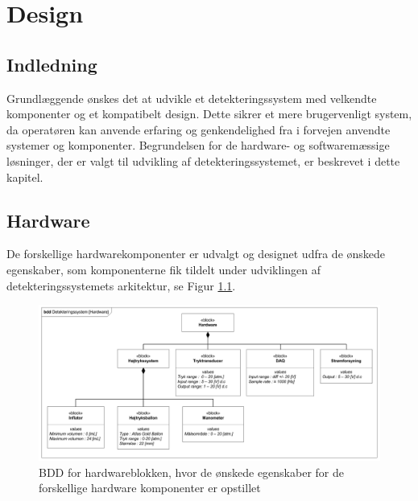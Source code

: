\chapter{Design}


\section*{Indledning}
Grundlæggende ønskes det at udvikle et detekteringssystem med velkendte komponenter og et kompatibelt design. Dette sikrer et mere brugervenligt system, da operatøren kan anvende erfaring og genkendelighed fra i forvejen anvendte systemer og komponenter. Begrundelsen for de hardware- og softwaremæssige løsninger, der er valgt til udvikling af detekteringssystemet, er beskrevet i dette kapitel. 

\section{Hardware} \label{hardwaredesign}
De forskellige hardwarekomponenter er udvalgt og designet udfra de ønskede egenskaber, som komponenterne fik tildelt under udviklingen af detekteringssystemets arkitektur, se Figur \ref{HW_BDD}.

\begin{figure}[H]
	\centering
	\includegraphics[width=1\textwidth]{Figure/HardwareBDD}
	\caption{BDD for hardwareblokken, hvor de ønskede egenskaber for de forskellige hardware komponenter er opstillet}
    \label{HW_BDD}
\end{figure}
     
